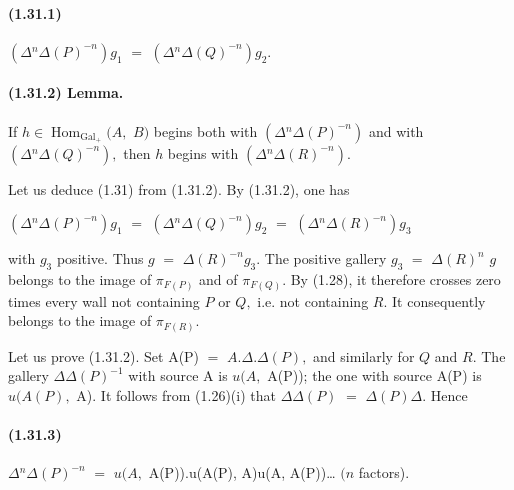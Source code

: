 \documentclass[10pt,a4paper]{article}
\begin{document}
\paragraph{(1.31.1)} \ensuremath{(\Delta{}^n\Delta{}(P)^{-n})g_1} \ensuremath{=} \ensuremath{(\Delta{}^n\Delta{}(Q)^{-n})g_2.}

\paragraph{(1.31.2) Lemma.} If \ensuremath{h\in{}\operatorname{Hom}_{\operatorname{Gal}_+}(A,} \ensuremath{B)} begins both with \ensuremath{(\Delta{}^n\Delta{}(P)^{-n})} and with \ensuremath{(\Delta{}^n\Delta{}(Q)^{-n}),} then \ensuremath{h} begins with \ensuremath{(\Delta{}^n\Delta{}(R)^{-n}).}

Let us deduce (1.31) from (1.31.2). By (1.31.2), one has\par

\ensuremath{(\Delta{}^n\Delta{}(P)^{-n})g_1} \ensuremath{=} \ensuremath{(\Delta{}^n\Delta{}(Q)^{-n})g_2} \ensuremath{=} \ensuremath{(\Delta{}^n\Delta{}(R)^{-n})g_3}\par

with \ensuremath{g_3} positive. Thus \ensuremath{g} \ensuremath{=} \ensuremath{\Delta{}(R)^{-n}g_3.} The positive gallery \ensuremath{g_3} \ensuremath{=} \ensuremath{\Delta{}(R)^n} \ensuremath{g} belongs to the image of \ensuremath{\pi{}_{F(P)}} and of \ensuremath{\pi{}_{F(Q)}.} By (1.28), it therefore crosses zero times every wall not containing \ensuremath{P} or \ensuremath{Q,} i.e. not containing \ensuremath{R.} It consequently belongs to the image of \ensuremath{\pi{}_{F(R)}.}\par

Let us prove (1.31.2). Set A(P) \ensuremath{=} \ensuremath{A.\Delta{}.\Delta{}(P),} and similarly for \ensuremath{Q} and \ensuremath{R.} The gallery \ensuremath{\Delta{}\Delta{}(P)^{-1}} with source A is \ensuremath{u(A,} A(P)); the one with source A(P) is \ensuremath{u(A(P),} A). It follows from (1.26)(i) that \ensuremath{\Delta{}\Delta{}(P)} \ensuremath{=} \ensuremath{\Delta{}(P)\Delta{}.} Hence\par

\paragraph{(1.31.3)} \ensuremath{\Delta{}^n\Delta{}(P)^{-n}} \ensuremath{=} \ensuremath{u(A,} A(P)).u(A(P), A)u(A, A(P))\ldots{} \ensuremath{(n} factors).
\end{document}
